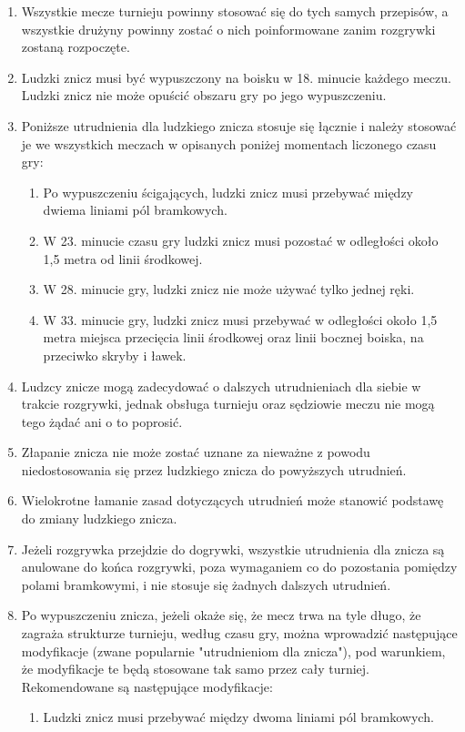 \documentclass[12pt]{article}
\begin{document}
\begin{enumerate}
  \item Wszystkie mecze turnieju powinny stosować się do tych samych
przepisów, a wszystkie drużyny powinny zostać o nich poinformowane zanim
rozgrywki zostaną rozpoczęte.

\item Ludzki znicz musi być wypuszczony na boisku w 18. minucie każdego
meczu. Ludzki znicz nie może opuścić obszaru gry po jego wypuszczeniu.

\item Poniższe utrudnienia dla ludzkiego znicza stosuje się łącznie i
należy stosować je we wszystkich meczach w opisanych poniżej momentach
liczonego czasu gry:
\begin{enumerate}
\item Po wypuszczeniu ścigających, ludzki znicz musi przebywać między
dwiema liniami pól bramkowych.

\item W 23. minucie czasu gry ludzki znicz musi pozostać w odległości
około 1,5 metra od linii środkowej.

\item W 28. minucie gry, ludzki znicz nie może używać tylko jednej ręki.

\item W 33. minucie gry, ludzki znicz musi przebywać w odległości około
1,5 metra miejsca przecięcia linii środkowej oraz linii bocznej boiska,
na przeciwko skryby i ławek.
\end{enumerate}

\item Ludzcy znicze mogą zadecydować o dalszych utrudnieniach dla siebie w
trakcie rozgrywki, jednak obsługa turnieju oraz sędziowie meczu nie mogą
tego żądać ani o to poprosić.

\item Złapanie znicza nie może zostać uznane za nieważne z powodu
niedostosowania się przez ludzkiego znicza do powyższych utrudnień.

\item Wielokrotne łamanie zasad dotyczących utrudnień może stanowić
podstawę do zmiany ludzkiego znicza.

\item Jeżeli rozgrywka przejdzie do dogrywki, wszystkie utrudnienia dla
znicza są anulowane do końca rozgrywki, poza wymaganiem co do pozostania
pomiędzy polami bramkowymi, i nie stosuje się żadnych dalszych
utrudnień.

\item Po wypuszczeniu znicza, jeżeli okaże się, że mecz trwa na tyle długo, że
zagraża strukturze turnieju, według czasu gry, można wprowadzić
następujące modyfikacje (zwane popularnie "utrudnieniom dla znicza"),
pod warunkiem, że modyfikacje te będą stosowane tak samo przez cały
turniej. Rekomendowane są następujące modyfikacje:
\begin{enumerate}
\item Ludzki znicz musi przebywać między dwoma liniami pól bramkowych.


\end{enumerate}
\end{enumerate}
\end{document}

